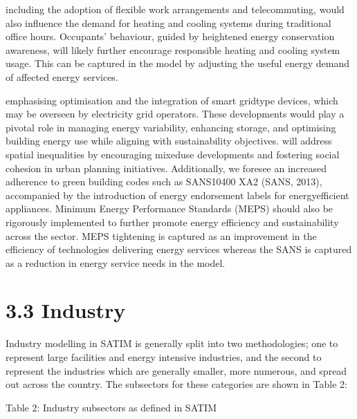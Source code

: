 \documentclass[letterpaper,10pt,english]{jupyterBook}
\begin{document}
\sphinxAtStartPar
{} including the adoption of flexible work arrangements and telecommuting, would also influence the demand for heating and cooling systems during traditional office hours. Occupants’ behaviour, guided by heightened energy conservation awareness, will likely further encourage responsible heating and cooling system usage. This can be captured in the model by adjusting the useful energy demand of affected energy services.

\sphinxAtStartPar
{} emphasising optimisation and the integration of smart grid\sphinxhyphen{}type devices, which may be overseen by electricity grid operators. These developments would play a pivotal role in managing energy variability, enhancing storage, and optimising building energy use while aligning with sustainability objectives.  will address spatial inequalities by encouraging mixed\sphinxhyphen{}use developments and fostering social cohesion in urban planning initiatives. Additionally, we foresee an increased adherence to green building codes such as SANS10400 XA2 (SANS, 2013), accompanied by the introduction of energy endorsement labels for energy\sphinxhyphen{}efficient appliances. Minimum Energy Performance Standards (MEPS) should also be rigorously implemented to further promote energy efficiency and sustainability across the sector. MEPS tightening is captured as an improvement in the efficiency of technologies delivering energy services whereas the SANS is captured as a reduction in energy service needs in the model.


\section{3.3 Industry}
\label{\detokenize{03Energydemand:industry}}
\sphinxAtStartPar
Industry modelling in SATIM is generally split into two methodologies; one to represent large facilities and energy intensive industries, and the second to represent the industries which are generally smaller, more numerous, and spread out across the country. The sub\sphinxhyphen{}sectors for these categories are shown in Table 2:

\sphinxAtStartPar
Table 2: Industry subsectors as defined in SATIM
\end{document}
